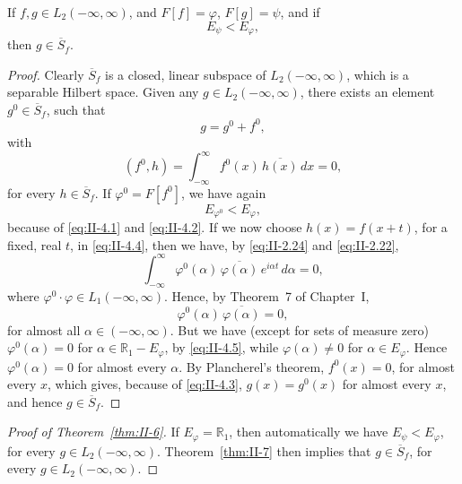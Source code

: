\begin{theorem}\label{thm:II-7}
If $f,g\in L_{2}(-\infty,\infty)$, and $F[f]=\varphi$, $F[g]=\psi$, and if
\begin{equation*}\tag{4.2}\label{eq:II-4.2b}
E_{\psi}<E_{\varphi},
\end{equation*}
then $g\in\overline{S}_{f}$.
\end{theorem}
\begin{proof}
Clearly $\overline{S}_{f}$ is a closed, linear subspace of $L_{2}(-\infty,\infty)$, which is a separable Hilbert space. Given any $g\in L_{2}(-\infty,\infty)$, there exists an element $g^{0}\in\overline{S}_{f}$, such that
\begin{equation}\tag{4.3}\label{eq:II-4.3}
g=g^{0}+f^{0},
\end{equation}
with
\begin{equation}\tag{4.4}\label{eq:II-4.4}
(f^{0},h)=\int_{-\infty}^{\infty}f^{0}(x)\,\overline{h(x)}\,dx=0,
\end{equation}
for every $h\in\overline{S}_{f}$. If $\varphi^{0}=F[f^{0}]$, we have again
\begin{equation}\tag{4.5}\label{eq:II-4.5}
E_{\varphi^{0}}<E_{\varphi},
\end{equation}
because of \eqref{eq:II-4.1} and \eqref{eq:II-4.2}. If we now choose $h(x)=f(x+t)$, for a fixed, real $t$, in \eqref{eq:II-4.4}, then we have, by \eqref{eq:II-2.24} and \eqref{eq:II-2.22},
\[
\int_{-\infty}^{\infty}\varphi^{0}(\alpha)\,\overline{\varphi(\alpha)}\,e^{i\alpha t}\,d\alpha=0,
\]
where $\varphi^{0}\cdot\varphi\in L_{1}(-\infty,\infty)$. Hence, by Theorem~7 of Chapter~I,
\begin{equation}\tag{4.6}\label{eq:II-4.6}
\varphi^{0}(\alpha)\,\overline{\varphi(\alpha)}=0,
\end{equation}
for almost all $\alpha\in(-\infty,\infty)$. But we have (except for sets of measure zero) $\varphi^{0}(\alpha)=0$ for $\alpha\in\mathbb R_{1}-E_{\varphi}$, by \eqref{eq:II-4.5}, while $\varphi(\alpha)\neq 0$ for $\alpha\in E_{\varphi}$. Hence $\varphi^{0}(\alpha)=0$ for almost every $\alpha$. By Plancherel's theorem, $f^{0}(x)=0$, for almost every $x$, which gives, because of \eqref{eq:II-4.3}, $g(x)=g^{0}(x)$ for almost every $x$, and hence $g\in\overline{S}_{f}$.
\end{proof}

\begin{proof}[Proof of Theorem~\ref{thm:II-6}]
If $E_{\varphi}=\mathbb R_{1}$, then automatically we have $E_{\psi}<E_{\varphi}$, for every $g\in L_{2}(-\infty,\infty)$. Theorem~\ref{thm:II-7} then implies that $g\in\overline{S}_{f}$, for every $g\in L_{2}(-\infty,\infty)$.
\end{proof}


